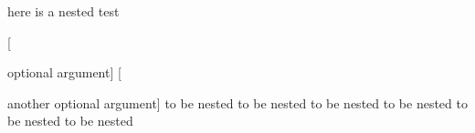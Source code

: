 here is a nested test
\begin{one}

	[

		optional argument]
	[

		another optional argument]
	to be nested to be nested
	to be nested to be nested
	to be nested to be nested
\end{one}
